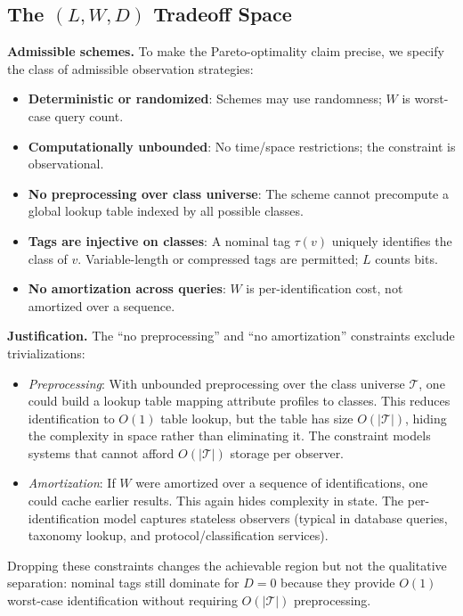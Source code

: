 \subsection{\texorpdfstring{The $(L, W, D)$ Tradeoff Space}{The (L, W, D) Tradeoff Space}}

\textbf{Admissible schemes.} To make the Pareto-optimality claim precise, we specify the class of admissible observation strategies:
\begin{itemize}
\item \textbf{Deterministic or randomized}: Schemes may use randomness; $W$ is worst-case query count.
\item \textbf{Computationally unbounded}: No time/space restrictions; the constraint is observational.
\item \textbf{No preprocessing over class universe}: The scheme cannot precompute a global lookup table indexed by all possible classes.
\item \textbf{Tags are injective on classes}: A nominal tag $\tau(v)$ uniquely identifies the class of $v$. Variable-length or compressed tags are permitted; $L$ counts bits.
\item \textbf{No amortization across queries}: $W$ is per-identification cost, not amortized over a sequence.
\end{itemize}

\textbf{Justification.} The ``no preprocessing'' and ``no amortization'' constraints exclude trivializations:
\begin{itemize}
\item \emph{Preprocessing}: With unbounded preprocessing over the class universe $\mathcal{T}$, one could build a lookup table mapping attribute profiles to classes. This reduces identification to $O(1)$ table lookup, but the table has size $O(|\mathcal{T}|)$, hiding the complexity in space rather than eliminating it. The constraint models systems that cannot afford $O(|\mathcal{T}|)$ storage per observer.
\item \emph{Amortization}: If $W$ were amortized over a sequence of identifications, one could cache earlier results. This again hides complexity in state. The per-identification model captures stateless observers (typical in database queries, taxonomy lookup, and protocol/classification services).
\end{itemize}
Dropping these constraints changes the achievable region but not the qualitative separation: nominal tags still dominate for $D = 0$ because they provide $O(1)$ worst-case identification without requiring $O(|\mathcal{T}|)$ preprocessing.

